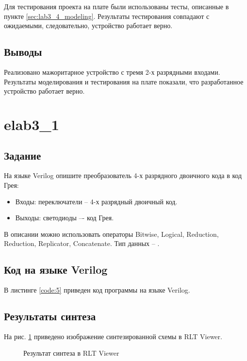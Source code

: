 Для тестирования проекта на плате были использованы тесты, описанные в пункте \ref{sec:lab3_4_modeling}. Результаты тестирования совпадают с ожидаемыми, следовательно, устройство работает верно.

\subsection{Выводы}

Реализовано мажоритарное устройство с тремя 2-х разрядными входами. Результаты моделирования и тестирования на плате показали, что разработанное устройство работает верно.

\section{elab3\_1}

\subsection{Задание}

На языке Verilog опишите преобразователь 4-х разрядного двоичного кода в код Грея:
\begin{itemize}
	\item Входы: переключатели  -- 4-х разрядный двоичный код.
	\item Выходы: светодиоды  –- код Грея.
\end{itemize}

В описании можно использовать операторы Bitwise, Logical, Reduction, Reduction, Replicator, Concatenate. Тип данных -- .

\subsection{Код на языке Verilog}

В листинге \ref{code:5} приведен код программы на языке Verilog.

%

\subsection{Результаты синтеза}

На рис. \ref{fig:elab3_1_rtl} приведено изображение синтезированной схемы в RLT Viewer.

\begin{figure}[H]
\begin{center}
	\caption{Результат синтеза в RLT Viewer}
	\label{fig:elab3_1_rtl}
\end{center}
\end{figure}

